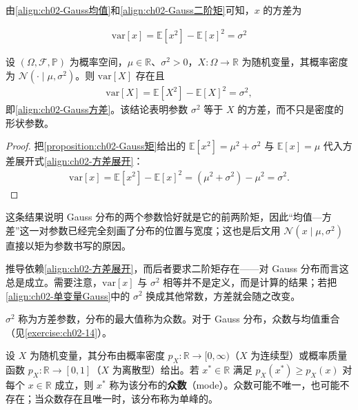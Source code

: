 \documentclass[../../main.tex]{subfiles}
\begin{document}
由\eqref{align:ch02-Gauss均值}和\eqref{align:ch02-Gauss二阶矩}可知，$x$ 的方差为

\begin{align}
  \mathrm{var}[x] = \mathbb{E}\left[x^{2}\right] - \mathbb{E}[x]^{2} = \sigma^{2}
  \label{align:ch02-Gauss方差}
\end{align}

\begin{proposition}\label{proposition:ch02-Gauss方差}
设 $(\Omega,\mathcal{F},\mathbb{P})$ 为概率空间，$\mu\in\mathbb{R}$、$\sigma^{2}>0$，$X:\Omega\to\mathbb{R}$ 为随机变量，其概率密度为 $\mathcal{N}(\cdot\mid\mu,\sigma^{2})$。则 $\mathrm{var}[X]$ 存在且
\begin{align*}
  \mathrm{var}[X]=\mathbb{E}[X^{2}]-\mathbb{E}[X]^{2}=\sigma^{2},
\end{align*}
即\eqref{align:ch02-Gauss方差}。该结论表明参数 $\sigma^{2}$ 等于 $X$ 的方差，而不只是密度的形状参数。
\end{proposition}

\begin{proof}
把\cref{proposition:ch02-Gauss矩}给出的 $\mathbb{E}[x^{2}]=\mu^{2}+\sigma^{2}$ 与 $\mathbb{E}[x]=\mu$ 代入方差展开式\eqref{align:ch02-方差展开}：
\begin{align*}
 \mathrm{var}[x] = \mathbb{E}[x^{2}] - \mathbb{E}[x]^{2} = (\mu^{2}+\sigma^{2}) - \mu^{2} = \sigma^{2} .
\end{align*}
\end{proof}

\begin{remark}
这条结果说明 Gauss 分布的两个参数恰好就是它的前两阶矩，因此“均值—方差”这一对参数已经完全刻画了分布的位置与宽度；这也是后文用 $\mathcal{N}(x\mid\mu,\sigma^{2})$ 直接以矩为参数书写的原因。

推导依赖\eqref{align:ch02-方差展开}，而后者要求二阶矩存在——对 Gauss 分布而言这总是成立。需要注意，$\mathrm{var}[x]$ 与 $\sigma^{2}$ 相等并不是定义，而是计算的结果；若把\eqref{align:ch02-单变量Gauss}中的 $\sigma^{2}$ 换成其他常数，方差就会随之改变。
\end{remark}

$\sigma^{2}$ 称为方差参数，分布的最大值称为众数。对于 Gauss 分布，众数与均值重合（见\cref{exercise:ch02-14}）。

\begin{definition}[众数]\label{definition:ch02-众数}
设 $X$ 为随机变量，其分布由概率密度 $p_X:\mathbb{R}\to[0,\infty)$（$X$ 为连续型）或概率质量函数 $p_X:\mathbb{R}\to[0,1]$（$X$ 为离散型）给出。若 $x^{*}\in\mathbb{R}$ 满足 $p_X(x^{*})\geqslant p_X(x)$ 对每个 $x\in\mathbb{R}$ 成立，则 $x^{*}$ 称为该分布的\textbf{众数}（mode）。众数可能不唯一，也可能不存在；当众数存在且唯一时，该分布称为单峰的。
\end{definition}
\end{document}
